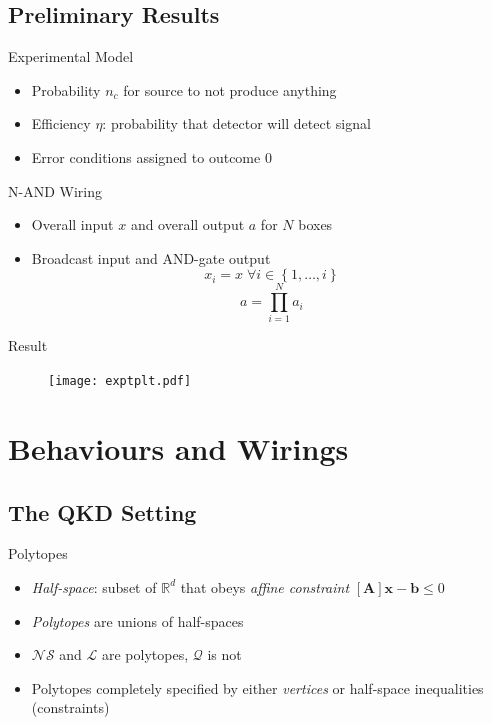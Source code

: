 \documentclass[xcolor=dvipsnames]{beamer}
\newcommand{\?}{\mathrel{?}} %
\newcommand{\cvec}[1]{\boldsymbol{\mathbf{#1}}}    %
\newcommand{\R}{\mathbb{R}} %
\newcommand{\dintv}[2]{\left\{#1,\ldots,#2\right\}}
\newcommand{\matr}[1]{\left[\mathbf{#1}\right]} %
\newcommand{\Ls}{\mathcal{L}}
\newcommand{\Qs}{\mathcal{Q}}
\newcommand{\NSs}{\mathcal{NS}}
\begin{document}
\subsection{Preliminary Results}

\begin{frame}{Experimental Model}
  \begin{itemize}[<+->]
    \item Probability \(n_c\) for source to not produce anything
    \item Efficiency \(\eta\): probability that detector will detect signal
    \item Error conditions assigned to outcome \(0\)
  \end{itemize}
\end{frame}

\begin{frame}{N-AND Wiring}
  \begin{itemize}[<+->]
    \item Overall input \(x\) and overall output \(a\) for \(N\) boxes
    \item Broadcast input and AND-gate output
      \[ x_i = x\;\forall i \in \dintv{1}{i} \]
      \[ a = \prod_{i=1}^N a_i \]
  \end{itemize}
\end{frame}

\begin{frame}{Result}
    \begin{figure}
      \texttt{[image: exptplt.pdf]}
    \end{figure}
\end{frame}

\section{Behaviours and Wirings}

\subsection{The QKD Setting}

\begin{frame}{Polytopes}
  \begin{itemize}[<+->]
    \item \emph{Half-space}: subset of \(\R^d\) that obeys \emph{affine constraint} \(\matr{A}\cvec{x} - \cvec{b} \leq 0\)
    \item \emph{Polytopes} are unions of half-spaces
    \item \(\NSs\) and \(\Ls\) are polytopes, \alert{\(\Qs\) is not}
    \item Polytopes completely specified by either \emph{vertices} or half-space inequalities (constraints)
  \end{itemize}
\end{frame}
\end{document}
